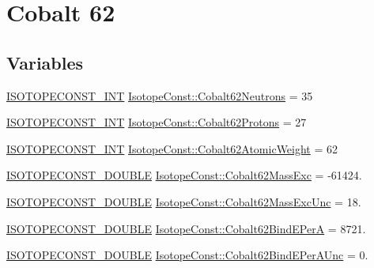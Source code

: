 \hypertarget{group___isotope_const-_cobalt-_co62}{}\section{Cobalt 62}
\label{group___isotope_const-_cobalt-_co62}
\subsection*{Variables}
\begin{DoxyCompactItemize}
\item 
\mbox{\hyperlink{group___isotope_const-_macros_ga5f18360b3e99483a35c32d789e62621c}{I\+S\+O\+T\+O\+P\+E\+C\+O\+N\+S\+T\+\_\+\+I\+NT}} \mbox{\hyperlink{group___isotope_const-_cobalt-_co62_ga18774fa34d601d6bf8848aca720d43ab}{Isotope\+Const\+::\+Cobalt62\+Neutrons}} = 35
\item 
\mbox{\hyperlink{group___isotope_const-_macros_ga5f18360b3e99483a35c32d789e62621c}{I\+S\+O\+T\+O\+P\+E\+C\+O\+N\+S\+T\+\_\+\+I\+NT}} \mbox{\hyperlink{group___isotope_const-_cobalt-_co62_gac7ca52beb8e4e034f6f9c684f6df501b}{Isotope\+Const\+::\+Cobalt62\+Protons}} = 27
\item 
\mbox{\hyperlink{group___isotope_const-_macros_ga5f18360b3e99483a35c32d789e62621c}{I\+S\+O\+T\+O\+P\+E\+C\+O\+N\+S\+T\+\_\+\+I\+NT}} \mbox{\hyperlink{group___isotope_const-_cobalt-_co62_ga4d0bbe8a97f6c7586a994605c3deda43}{Isotope\+Const\+::\+Cobalt62\+Atomic\+Weight}} = 62
\item 
\mbox{\hyperlink{group___isotope_const-_macros_ga8f45a7272ce02c0b4c65c44636ed719a}{I\+S\+O\+T\+O\+P\+E\+C\+O\+N\+S\+T\+\_\+\+D\+O\+U\+B\+LE}} \mbox{\hyperlink{group___isotope_const-_cobalt-_co62_gaac5d9c28d406dfb5299d553ba9214cad}{Isotope\+Const\+::\+Cobalt62\+Mass\+Exc}} = -\/61424.
\item 
\mbox{\hyperlink{group___isotope_const-_macros_ga8f45a7272ce02c0b4c65c44636ed719a}{I\+S\+O\+T\+O\+P\+E\+C\+O\+N\+S\+T\+\_\+\+D\+O\+U\+B\+LE}} \mbox{\hyperlink{group___isotope_const-_cobalt-_co62_gac7177124260a00a9dcec660c032b962a}{Isotope\+Const\+::\+Cobalt62\+Mass\+Exc\+Unc}} = 18.
\item 
\mbox{\hyperlink{group___isotope_const-_macros_ga8f45a7272ce02c0b4c65c44636ed719a}{I\+S\+O\+T\+O\+P\+E\+C\+O\+N\+S\+T\+\_\+\+D\+O\+U\+B\+LE}} \mbox{\hyperlink{group___isotope_const-_cobalt-_co62_gab09f1316e9a09e5f1227d7196913a4b2}{Isotope\+Const\+::\+Cobalt62\+Bind\+E\+PerA}} = 8721.
\item 
\mbox{\hyperlink{group___isotope_const-_macros_ga8f45a7272ce02c0b4c65c44636ed719a}{I\+S\+O\+T\+O\+P\+E\+C\+O\+N\+S\+T\+\_\+\+D\+O\+U\+B\+LE}} \mbox{\hyperlink{group___isotope_const-_cobalt-_co62_gadaf95b1439174f87e3a65c280e852936}{Isotope\+Const\+::\+Cobalt62\+Bind\+E\+Per\+A\+Unc}} = 0.

\end{DoxyCompactItemize}
